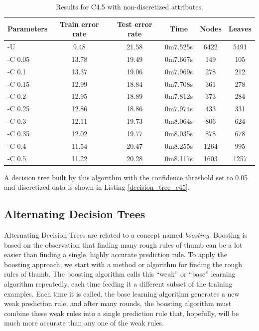 \documentclass[a4paper]{llncs}
\begin{document}
\begin{table}[ht]
  \begin{center}
  \begin{tabular}{ | l | c | c | c | c | c |}
    \hline
    \textbf{Parameters} & \textbf{Train error rate} & \textbf{Test error rate} & \textbf{Time} & \textbf{Nodes} & \textbf{Leaves} \\ \hline
    -U & 9.48 & 21.58 & 0m7.525s & 6422 & 5491 \\ \hline
    -C 0.05 & 13.78 & 19.49 & 0m7.667s & 149 & 105 \\ \hline
    -C 0.1 & 13.37 & 19.06 & 0m7.969s & 278 & 212 \\ \hline
    -C 0.15 & 12.99 & 18.84 & 0m7.708s & 361 & 278 \\ \hline
    -C 0.2 & 12.95 & 18.89 & 0m7.812s & 373 & 284 \\ \hline
    -C 0.25 & 12.86 & 18.86 & 0m7.974s & 433 & 331 \\ \hline
    -C 0.3 & 12.11 & 19.73 & 0m8.064s & 806 & 624 \\ \hline
    -C 0.35 & 12.02 & 19.77 & 0m8.035s & 878 & 678 \\ \hline
    -C 0.4 & 11.54 & 20.47 & 0m8.255s & 1264 & 995 \\ \hline
    -C 0.5 & 11.22 & 20.28 & 0m8.117s & 1603 & 1257 \\ \hline
  \end{tabular}
  \caption{Results for C4.5 with non-discretized attributes.}
  \label{tbl:results_c45_raw}
  \end{center}
\end{table}

A decision tree built by this algorithm with the confidence threshold set to 0.05 and
discretized data is shown in Listing \ref{decision_tree_c45}.

\subsection{Alternating Decision Trees}

Alternating Decision Trees are related to a concept named \textit{boosting}.
Boosting is based on the observation that finding many rough rules of thumb can be a lot easier 
than finding a single, highly accurate prediction rule. To apply the boosting approach,
we start with a method or algorithm for finding the rough rules of thumb. 
The boosting algorithm calls this “weak” or “base” learning algorithm repeatedly, 
each time feeding it a different subset of the training examples. Each time 
it is called, the base learning algorithm generates a new weak prediction rule, and 
after many rounds, the boosting algorithm must combine these weak rules into a 
single prediction rule that, hopefully, will be much more accurate than any one of 
the weak rules. \cite{boosting}
\end{document}
